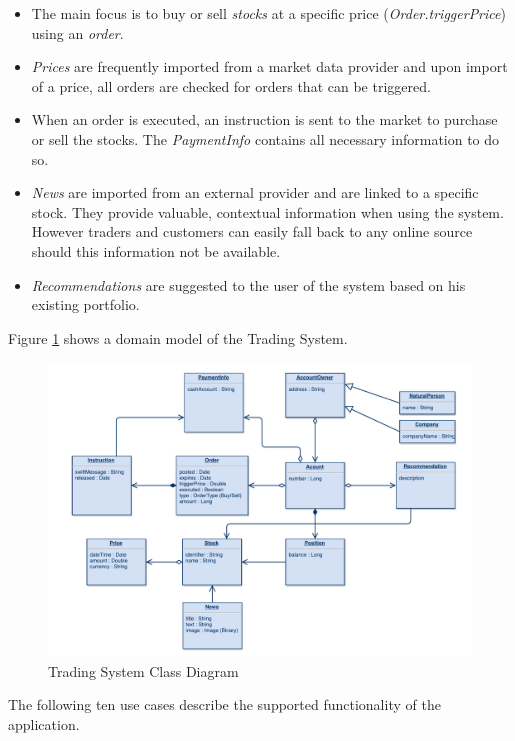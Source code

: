 \begin{itemize}
\item The main focus is to buy or sell \textit{stocks} at a specific price (\textit{Order.triggerPrice}) using an \textit{order}.
\item \textit{Prices} are frequently imported from a market data provider and upon import of a price, all orders are checked for orders that can be triggered.
\item When an order is executed, an instruction is sent to the market to purchase or sell the stocks. The \textit{PaymentInfo} contains all necessary information to do so. 
\item \textit{News} are imported from an external provider and are linked to a specific stock. They provide valuable, contextual information when using the system. However traders and customers can easily fall back to any online source should this information not be available.
\item \textit{Recommendations} are suggested to the user of the system based on his existing portfolio.
\end{itemize}

Figure \ref{fig:tradingClasses} shows a domain model of the Trading System.

\begin{figure}[H]
	\includegraphics[scale=0.5]{diagrams/TradingSystem.pdf}
	\caption{Trading System Class Diagram}
	\label{fig:tradingClasses}
\end{figure}

The following ten use cases describe the supported functionality of the application.

